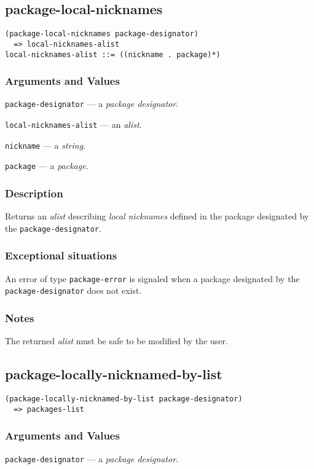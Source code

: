 \documentclass[11pt]{article}
\begin{document}
\subsection{package-local-nicknames}
\label{sec:org35164bb}
\begin{verbatim}
(package-local-nicknames package-designator)
  => local-nicknames-alist
local-nicknames-alist ::= ((nickname . package)*)
\end{verbatim}
\subsubsection{Arguments and Values}
\label{sec:orgbdb16cd}
\texttt{package-designator} --- a \emph{package designator}.

\texttt{local-nicknames-alist} --- an \emph{alist}.

\texttt{nickname} --- a \emph{string}.

\texttt{package} --- a \emph{package}.
\subsubsection{Description}
\label{sec:org347322c}
Returns an \emph{alist} describing \emph{local nicknames} defined in the package designated
by the \texttt{package-designator}.
\subsubsection{Exceptional situations}
\label{sec:orgca1944b}
An error of type \texttt{package-error} is signaled when a package designated by the
\texttt{package-designator} does not exist.
\subsubsection{Notes}
\label{sec:orgd4382e7}
The returned \emph{alist} must be safe to be modified by the user.
\subsection{package-locally-nicknamed-by-list}
\label{sec:orgb877bc1}
\begin{verbatim}
(package-locally-nicknamed-by-list package-designator)
  => packages-list
\end{verbatim}
\subsubsection{Arguments and Values}
\label{sec:org980f4cf}
\texttt{package-designator} --- a \emph{package designator}.
\end{document}
